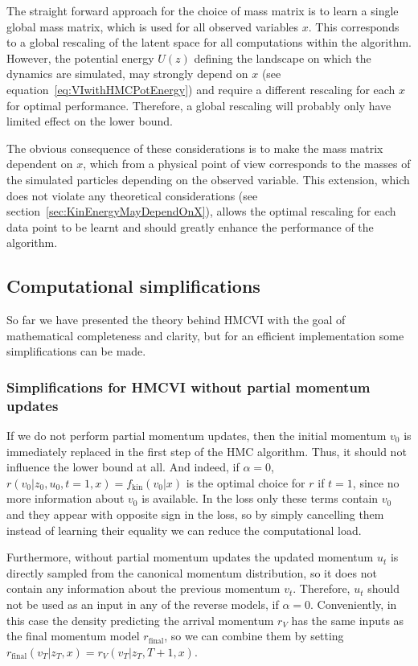 The straight forward approach for the choice of mass matrix is to learn a single global mass matrix, which is used for all observed variables $x$. This corresponds to a global rescaling of the latent space for all computations within the algorithm. However, the potential energy $U(z)$ defining the landscape on which the dynamics are simulated, may strongly depend on $x$ (see equation~\eqref{eq:VIwithHMCPotEnergy}) and require a different rescaling for each $x$ for optimal performance. Therefore, a global rescaling will probably only have limited effect on the lower bound.

The obvious consequence of these considerations is to make the mass matrix dependent on $x$, which from a physical point of view corresponds to the masses of the simulated particles depending on the observed variable. This extension, which does not violate any theoretical considerations (see section~\ref{sec:KinEnergyMayDependOnX}), allows the optimal rescaling for each data point to be learnt and should greatly enhance the performance of the algorithm.

\subsection{Computational simplifications}

So far we have presented the theory behind HMCVI with the goal of mathematical completeness and clarity, but for an efficient implementation some simplifications can be made.

\subsubsection{Simplifications for HMCVI without partial momentum updates}
\label{sec:SimplificationWithoutPartialMomentumUpdate}
If we do not perform partial momentum updates, then the initial momentum $v_0$ is immediately replaced in the first step of the HMC algorithm. Thus, it should not influence the lower bound at all. And indeed, if $\alpha = 0$, $r(v_0|z_0, u_0, t=1, x) = f_\textrm{kin}(v_0|x)$ is the optimal choice for $r$ if $t=1$, since no more information about $v_0$ is available. In the loss only these terms contain $v_0$ and they appear with opposite sign in the loss, so by simply cancelling them instead of learning their equality we can reduce the computational load.

Furthermore, without partial momentum updates the updated momentum $u_t$ is directly sampled from the canonical momentum distribution, so it does not contain any information about the previous momentum $v_t$. Therefore, $u_t$ should not be used as an input in any of the reverse models, if $\alpha=0$. Conveniently, in this case the density predicting the arrival momentum $r_V$ has the same inputs as the final momentum model $r_\textrm{final}$, so we can combine them by setting $r_\textrm{final}(v_T | z_T, x) = r_V(v_T | z_T, T+1, x)$.

